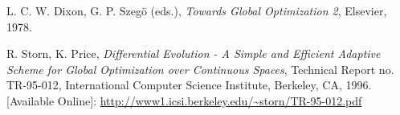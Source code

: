 \documentclass{article}
\begin{document}
	
	\newpage
	
	\begin{thebibliography}{9}
		
		 L. C. W. Dixon, G. P. Szegö (eds.), \textit{Towards Global Optimization 2}, Elsevier, 1978.
		
		 R. Storn, K. Price, \textit{Differential Evolution - A Simple and Efficient Adaptive Scheme for Global Optimization over Continuous Spaces}, Technical Report no. TR-95-012, International Computer Science Institute, Berkeley, CA, 1996. [Available Online]: \url{http://www1.icsi.berkeley.edu/~storn/TR-95-012.pdf}
		
		
	\end{thebibliography}
	
\end{document}
